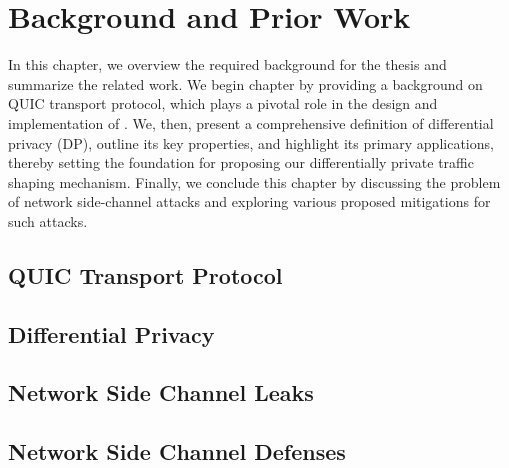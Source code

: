 \chapter{Background and Prior Work}\label{ch:background}
In this chapter, we overview the required background for the thesis and summarize the related work. 
We begin chapter by providing a background on QUIC transport protocol, which plays a pivotal role in the design and implementation of {\sys}.
We, then, present a comprehensive definition of differential privacy (DP), outline its key properties, and highlight its primary applications, thereby setting the foundation for proposing our differentially private traffic shaping mechanism.
Finally, we conclude this chapter by discussing the problem of network side-channel attacks and exploring various proposed mitigations for such attacks. 

\section{QUIC Transport Protocol}


\section{Differential Privacy}\label{sec:dp-background}


\section{Network Side Channel Leaks}\label{sec:ns-attacks}

\section{Network Side Channel Defenses}\label{sec:ns-defenses}







